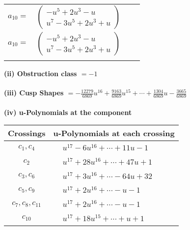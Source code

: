 \documentclass[1p]{elsarticle_modified}
\theoremstyle{definition}
\begin{document}
\begin{tabular}{m{7pt} m{180pt} m{7pt} m{180pt} }
\flushright $a_{10}=$&$\begin{pmatrix}- u^5+2 u^3- u\\u^7-3 u^5+2 u^3+u\end{pmatrix}$\\ \flushright $a_{10}=$&$\begin{pmatrix}- u^5+2 u^3- u\\u^7-3 u^5+2 u^3+u\end{pmatrix}$\\&\end{tabular}
\flushleft \textbf{(ii) Obstruction class $= -1$}\\~\\
\flushleft \textbf{(iii) Cusp Shapes $= -\frac{12279}{6869} u^{16}+\frac{9163}{6869} u^{15}+\cdots+\frac{1304}{6869} u-\frac{3665}{6869}$}\\~\\
\newpage\renewcommand{\arraystretch}{1}
\flushleft \textbf{(iv) u-Polynomials at the component}\newline \\
\begin{tabular}{m{50pt}|m{274pt}}
Crossings & \hspace{64pt}u-Polynomials at each crossing \\
\hline $$\begin{aligned}c_{1},c_{4}\end{aligned}$$&$\begin{aligned}
&u^{17}-6 u^{16}+\cdots+11 u-1
\end{aligned}$\\
\hline $$\begin{aligned}c_{2}\end{aligned}$$&$\begin{aligned}
&u^{17}+28 u^{16}+\cdots+47 u+1
\end{aligned}$\\
\hline $$\begin{aligned}c_{3},c_{6}\end{aligned}$$&$\begin{aligned}
&u^{17}+3 u^{16}+\cdots-64 u+32
\end{aligned}$\\
\hline $$\begin{aligned}c_{5},c_{9}\end{aligned}$$&$\begin{aligned}
&u^{17}+2 u^{16}+\cdots- u-1
\end{aligned}$\\
\hline $$\begin{aligned}c_{7},c_{8},c_{11}\end{aligned}$$&$\begin{aligned}
&u^{17}+2 u^{16}+\cdots- u-1
\end{aligned}$\\
\hline $$\begin{aligned}c_{10}\end{aligned}$$&$\begin{aligned}
&u^{17}+18 u^{15}+\cdots+u+1
\end{aligned}$\\
\hline
\end{tabular}\\~\\
\end{document}
